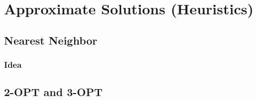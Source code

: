 \chapter{Approximate Solutions (Heuristics)}

\section{Nearest Neighbor}
    \subsection{Idea}


\section{2-OPT and 3-OPT}
